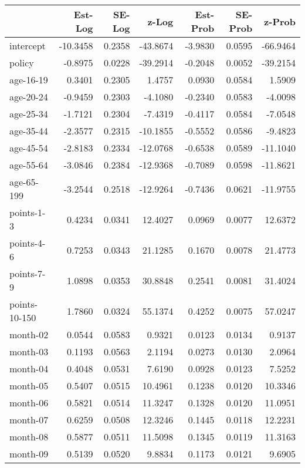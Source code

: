 \documentclass[10pt]{article}
\begin{document}
\begin{table}[ht]
\centering
\begin{tabular}{lrrrrrr}
  \hline
 & Est-Log & SE-Log & z-Log & Est-Prob & SE-Prob & z-Prob \\ 
  \hline
intercept & -10.3458 & 0.2358 & -43.8674 & -3.9830 & 0.0595 & -66.9464 \\ 
  policy & -0.8975 & 0.0228 & -39.2914 & -0.2048 & 0.0052 & -39.2154 \\ 
  age-16-19 & 0.3401 & 0.2305 & 1.4757 & 0.0930 & 0.0584 & 1.5909 \\ 
  age-20-24 & -0.9459 & 0.2303 & -4.1080 & -0.2340 & 0.0583 & -4.0098 \\ 
  age-25-34 & -1.7121 & 0.2304 & -7.4319 & -0.4117 & 0.0584 & -7.0548 \\ 
  age-35-44 & -2.3577 & 0.2315 & -10.1855 & -0.5552 & 0.0586 & -9.4823 \\ 
  age-45-54 & -2.8183 & 0.2334 & -12.0768 & -0.6538 & 0.0589 & -11.1040 \\ 
  age-55-64 & -3.0846 & 0.2384 & -12.9368 & -0.7089 & 0.0598 & -11.8621 \\ 
  age-65-199 & -3.2544 & 0.2518 & -12.9264 & -0.7436 & 0.0621 & -11.9755 \\ 
  points-1-3 & 0.4234 & 0.0341 & 12.4027 & 0.0969 & 0.0077 & 12.6372 \\ 
  points-4-6 & 0.7253 & 0.0343 & 21.1285 & 0.1670 & 0.0078 & 21.4773 \\ 
  points-7-9 & 1.0898 & 0.0353 & 30.8848 & 0.2541 & 0.0081 & 31.4024 \\ 
  points-10-150 & 1.7860 & 0.0324 & 55.1374 & 0.4252 & 0.0075 & 57.0247 \\ 
  month-02 & 0.0544 & 0.0583 & 0.9321 & 0.0123 & 0.0134 & 0.9137 \\ 
  month-03 & 0.1193 & 0.0563 & 2.1194 & 0.0273 & 0.0130 & 2.0964 \\ 
  month-04 & 0.4048 & 0.0531 & 7.6190 & 0.0928 & 0.0123 & 7.5252 \\ 
  month-05 & 0.5407 & 0.0515 & 10.4961 & 0.1238 & 0.0120 & 10.3346 \\ 
  month-06 & 0.5821 & 0.0514 & 11.3247 & 0.1328 & 0.0120 & 11.0951 \\ 
  month-07 & 0.6259 & 0.0508 & 12.3246 & 0.1445 & 0.0118 & 12.2231 \\ 
  month-08 & 0.5877 & 0.0511 & 11.5098 & 0.1345 & 0.0119 & 11.3163 \\ 
  month-09 & 0.5139 & 0.0520 & 9.8834 & 0.1173 & 0.0121 & 9.6905 \\ 

\end{tabular}
\end{table}
\end{document}

